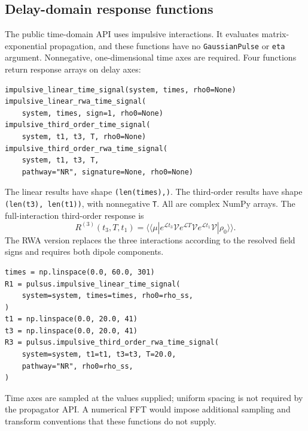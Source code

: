 \subsection{Delay-domain response functions}
\label{sec:time-domain}

The public time-domain API uses impulsive interactions. It evaluates
matrix-exponential propagation, and these functions have no
\texttt{GaussianPulse} or \texttt{eta} argument. Nonnegative,
one-dimensional time axes are required. Four functions return response
arrays on delay axes:
\par\noindent
\begin{minipage}{\linewidth}
\begin{lstlisting}[style=python]
impulsive_linear_time_signal(system, times, rho0=None)
impulsive_linear_rwa_time_signal(
    system, times, sign=1, rho0=None)
impulsive_third_order_time_signal(
    system, t1, t3, T, rho0=None)
impulsive_third_order_rwa_time_signal(
    system, t1, t3, T,
    pathway="NR", signature=None, rho0=None)
\end{lstlisting}
\end{minipage}\par
The linear results have shape \texttt{(len(times),)}. The third-order
results have shape \texttt{(len(t3), len(t1))}, with nonnegative
\texttt{T}. All are complex NumPy arrays. The full-interaction third-order
response is
\begin{equation}
 R^{(3)}(t_3,T,t_1)=\langle\!\langle\mu|
 e^{\mathcal L t_3}\mathcal V e^{\mathcal L T}
 \mathcal V e^{\mathcal L t_1}\mathcal V
 |\rho_0\rangle\!\rangle.
\end{equation}
The RWA version replaces the three interactions according to the resolved
field signs and requires both dipole components.

\par\noindent
\begin{minipage}{\linewidth}
\begin{lstlisting}[style=python]
times = np.linspace(0.0, 60.0, 301)
R1 = pulsus.impulsive_linear_time_signal(
    system=system, times=times, rho0=rho_ss,
)
t1 = np.linspace(0.0, 20.0, 41)
t3 = np.linspace(0.0, 20.0, 41)
R3 = pulsus.impulsive_third_order_rwa_time_signal(
    system=system, t1=t1, t3=t3, T=20.0,
    pathway="NR", rho0=rho_ss,
)
\end{lstlisting}
\end{minipage}\par
Time axes are sampled at the values supplied; uniform spacing is not
required by the propagator API. A numerical FFT would impose additional
sampling and transform conventions that these functions do not supply.

